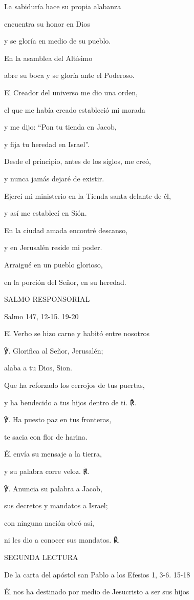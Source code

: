 La sabiduría hace su propia alabanza

encuentra su honor en Dios

y se gloría en medio de su pueblo.

En la asamblea del Altísimo

abre su boca y se gloría ante el Poderoso.

El Creador del universo me dio una orden,

el que me había creado estableció mi morada

y me dijo: ``Pon tu tienda en Jacob,

y fija tu heredad en Israel''.

Desde el principio, antes de los siglos, me creó,

y nunca jamás dejaré de existir.

Ejercí mi ministerio en la Tienda santa delante de él,

y así me establecí en Sión.

En la ciudad amada encontré descanso,

y en Jerusalén reside mi poder.

Arraigué en un pueblo glorioso,

en la porción del Señor, en su heredad.

SALMO RESPONSORIAL

Salmo 147, 12-15. 19-20

El Verbo se hizo carne y habitó entre nosotros

℣. Glorifica al Señor, Jerusalén;

alaba a tu Dios, Sion.

Que ha reforzado los cerrojos de tus puertas,

y ha bendecido a tus hijos dentro de ti. ℟.

℣. Ha puesto paz en tus fronteras,

te sacia con flor de harina.

Él envía su mensaje a la tierra,

y su palabra corre veloz. ℟.

℣. Anuncia su palabra a Jacob,

sus decretos y mandatos a Israel;

con ninguna nación obró así,

ni les dio a conocer sus mandatos. ℟.

SEGUNDA LECTURA

De la carta del apóstol san Pablo a los Efesios 1, 3-6. 15-18

Él nos ha destinado por medio de Jesucristo a ser sus hijos

